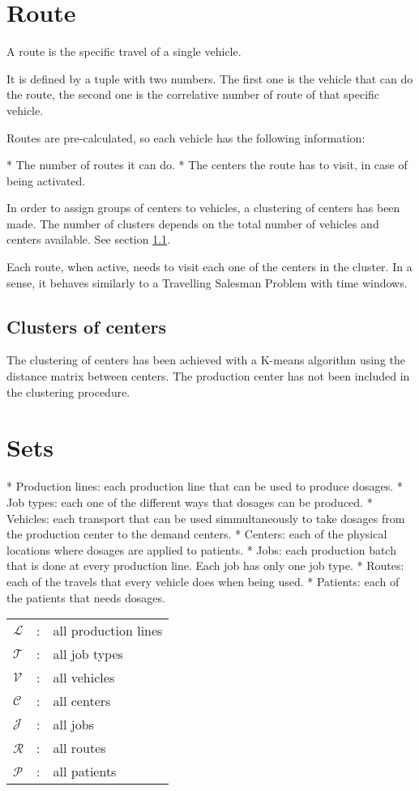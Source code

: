 \section{Route}

A route is the specific travel of a single vehicle.

It is defined by a tuple with two numbers. The first one is the vehicle that can do the route, the second one is the correlative number of route of that specific vehicle.

Routes are pre-calculated, so each vehicle has the following information:

* The number of routes it can do.
* The centers the route has to visit, in case of being activated.

In order to assign groups of centers to vehicles, a clustering of centers has been made. The number of clusters depends on the total number of vehicles and centers available. See section \ref{clusters}.

Each route, when active, needs to visit each one of the centers in the cluster. In a sense, it behaves similarly to a Travelling Salesman Problem with time windows.

\subsection{Clusters of centers}
\label{clusters}

The clustering of centers has been achieved with a K-means algorithm using the distance matrix between centers. The production center has not been included in the clustering procedure.

\section{Sets}

* Production lines: each production line that can be used to produce dosages.
* Job types: each one of the different ways that dosages can be produced.
* Vehicles: each transport that can be used simmultaneously to take dosages from the production center to the demand centers.
* Centers: each of the physical locations where dosages are applied to patients.
* Jobs: each production batch that is done at every production line. Each job has only one job type.
* Routes: each of the travels that every vehicle does when being used.
* Patients: each of the patients that needs dosages.

\begin{tabular}{p{15mm}lp{105mm}}
    $\mathcal{L}$    & : & all production lines \\
    $\mathcal{T}$    & : & all job types \\                    
    $\mathcal{V}$    & : & all vehicles \\    
    $\mathcal{C}$    & : & all centers \\    
    $\mathcal{J}$    & : & all jobs \\    
    $\mathcal{R}$    & : & all routes \\    
    $\mathcal{P}$    & : & all patients \\
\end{tabular}
\bigskip

